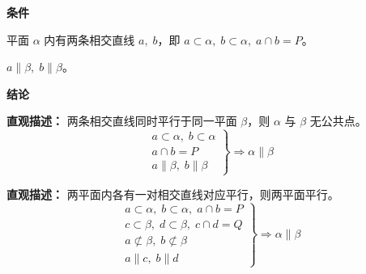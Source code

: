 \begin{statementbox}
	\textbf{\textcolor{CStatement}{条件}}
	\begin{description}[style=nextline, leftmargin=2.8em, labelsep=0.5em, itemsep=0.35em]
		\item[\textbf{\textcolor{CStatement}{条件1（平面内相交线）：}}] 平面 $\alpha$ 内有两条相交直线 $a,\;b$，即 $a \subset \alpha,\; b \subset \alpha,\; a \cap b = P$。
		\item[\textbf{\textcolor{CStatement}{条件2（均平行于 $\beta$）：}}] $a \parallel \beta,\; b \parallel \beta$。
	\end{description}

	\textbf{\textcolor{CStatement}{结论}}
	\begin{description}[style=nextline, leftmargin=2.8em, labelsep=0.5em, itemsep=0.45em]
		\item[\textbf{\textcolor{CStatement}{结论一（面面平行）：}}]
			\textbf{\textcolor{CStatement}{直观描述：}}
			两条相交直线同时平行于同一平面 $\beta$，则 $\alpha$ 与 $\beta$ 无公共点。
			\[
				\boxed{\left.\begin{array}{l}
				a \subset \alpha,\; b \subset \alpha\\
				a \cap b = P\\
				a \parallel \beta,\; b \parallel \beta
		\end{array}\right\} \Longrightarrow \alpha \parallel \beta}
		\]

	\item[\textbf{\textcolor{CStatement}{推广结论（线线平行推面面）：}}]
		\textbf{\textcolor{CStatement}{直观描述：}}
		两平面内各有一对相交直线对应平行，则两平面平行。
		\[
			\boxed{\left.\begin{array}{l}
			a \subset \alpha,\; b \subset \alpha,\; a \cap b = P\\
			c \subset \beta,\; d \subset \beta,\; c \cap d = Q\\
			a \not\subset \beta,\; b \not\subset \beta\\
			a \parallel c,\; b \parallel d
	\end{array}\right\} \Longrightarrow \alpha \parallel \beta}
	\]
\end{description}
\end{statementbox}
